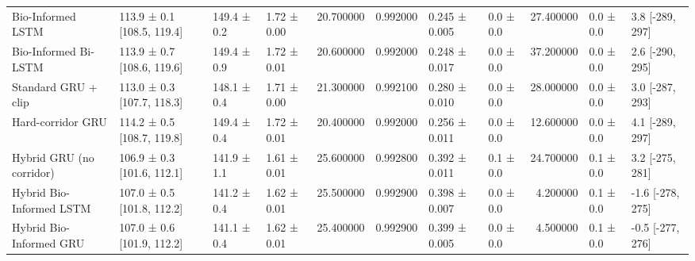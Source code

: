\begin{tabular}{llllrrllrll}
Bio-Informed LSTM & 113.9 ± 0.1 [108.5, 119.4] & 149.4 ± 0.2 & 1.72 ± 0.00 & 20.700000 & 0.992000 & 0.245 ± 0.005 & 0.0 ± 0.0 & 27.400000 & 0.0 ± 0.0 & 3.8 [-289, 297] \\
Bio-Informed Bi-LSTM & 113.9 ± 0.7 [108.6, 119.6] & 149.4 ± 0.9 & 1.72 ± 0.01 & 20.600000 & 0.992000 & 0.248 ± 0.017 & 0.0 ± 0.0 & 37.200000 & 0.0 ± 0.0 & 2.6 [-290, 295] \\
Standard GRU + clip & 113.0 ± 0.3 [107.7, 118.3] & 148.1 ± 0.4 & 1.71 ± 0.00 & 21.300000 & 0.992100 & 0.280 ± 0.010 & 0.0 ± 0.0 & 28.000000 & 0.0 ± 0.0 & 3.0 [-287, 293] \\
Hard-corridor GRU & 114.2 ± 0.5 [108.7, 119.8] & 149.4 ± 0.4 & 1.72 ± 0.01 & 20.400000 & 0.992000 & 0.256 ± 0.011 & 0.0 ± 0.0 & 12.600000 & 0.0 ± 0.0 & 4.1 [-289, 297] \\
Hybrid GRU (no corridor) & 106.9 ± 0.3 [101.6, 112.1] & 141.9 ± 1.1 & 1.61 ± 0.01 & 25.600000 & 0.992800 & 0.392 ± 0.011 & 0.1 ± 0.0 & 24.700000 & 0.1 ± 0.0 & 3.2 [-275, 281] \\
Hybrid Bio-Informed LSTM & 107.0 ± 0.5 [101.8, 112.2] & 141.2 ± 0.4 & 1.62 ± 0.01 & 25.500000 & 0.992900 & 0.398 ± 0.007 & 0.0 ± 0.0 & 4.200000 & 0.1 ± 0.0 & -1.6 [-278, 275] \\
Hybrid Bio-Informed GRU & 107.0 ± 0.6 [101.9, 112.2] & 141.1 ± 0.4 & 1.62 ± 0.01 & 25.400000 & 0.992900 & 0.399 ± 0.005 & 0.0 ± 0.0 & 4.500000 & 0.1 ± 0.0 & -0.5 [-277, 276] \\
\bottomrule
\end{tabular}
